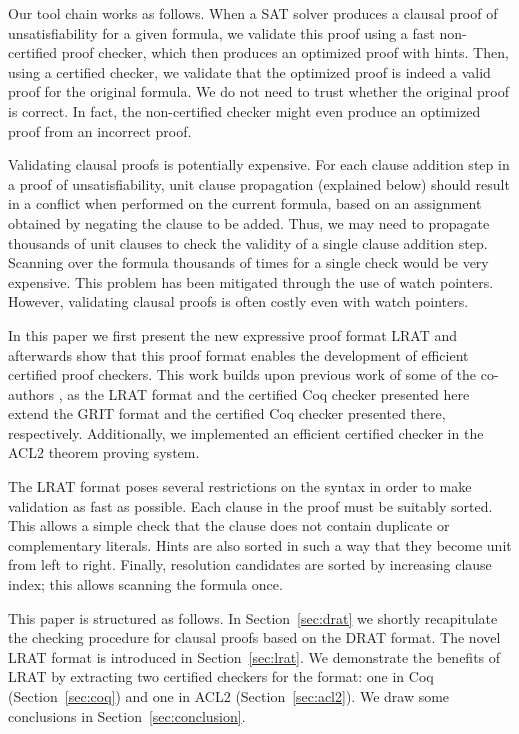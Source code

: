 \documentclass{article}
\begin{document}
Our tool chain works as follows.  When a SAT solver produces a clausal proof
of unsatisfiability for a given formula, we validate this proof using
a fast non-certified proof checker, which then produces an optimized
proof with hints.  Then, using a certified checker, we validate that
the optimized proof is indeed a valid proof for the original formula.
We do not need to trust whether the original proof is correct.  In
fact, the non-certified checker might even produce an optimized proof
from an incorrect proof.

Validating clausal proofs is potentially expensive.  For each clause
addition step in a proof of unsatisfiability, unit clause propagation
(explained below) should
result in a conflict when performed on the current formula, based on
an assignment obtained by negating the clause to be added.
Thus, we may need to propagate thousands of unit clauses to check the
validity of a single clause addition step.  Scanning over the formula
thousands of times for a single check would be very expensive.  This
problem has been mitigated through the use of watch pointers.
However, validating clausal proofs is often costly even with watch pointers.

In this paper we first present the new expressive proof format LRAT
and afterwards show that this proof format enables the development of
efficient certified proof checkers.
This work builds upon previous work of some of the co-authors
\cite{grit}, as the LRAT format and the certified Coq checker
presented here extend the GRIT format and the certified Coq checker
presented there, respectively. Additionally, we implemented an efficient 
certified checker in the ACL2 theorem proving system.

The LRAT format poses several restrictions on the syntax in order to
make validation as fast as possible.  Each clause in the proof
%
must be suitably sorted.  This allows a simple check that
the clause does not contain duplicate or complementary
literals.  Hints are also sorted in such a way that they become unit
from left to right.  Finally, resolution candidates are sorted by
increasing clause index; this allows scanning the formula once.

This paper is structured as follows. In Section~\ref{sec:drat} we shortly recapitulate
the checking procedure for clausal proofs based on the DRAT format.
The novel LRAT format is introduced in Section~\ref{sec:lrat}.
We demonstrate the benefits of LRAT by extracting two certified checkers 
for the format: one in Coq (Section~\ref{sec:coq}) and one in ACL2 (Section~\ref{sec:acl2}).
%
%
%
%
%
%
We draw some conclusions in Section~\ref{sec:conclusion}.
\end{document}
